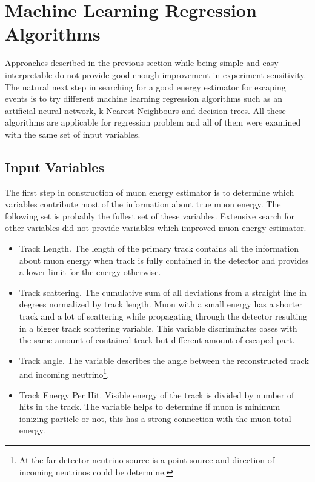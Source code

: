\section{Machine Learning Regression Algorithms}
Approaches described in the previous section while being simple and easy interpretable do
not provide good enough improvement in experiment sensitivity. The natural next step in
searching for a good energy estimator for escaping events is to try different machine 
learning regression algorithms such as an artificial neural network, k Nearest Neighbours and
decision trees. All these algorithms are applicable for regression problem and all of them 
were examined with the same set of input variables.

\subsection{Input Variables}
The first step in construction of muon energy estimator is to determine which variables 
contribute most of the information about true muon energy. The following set is probably
the fullest set of these variables. Extensive search for other variables did not provide 
variables which improved muon energy estimator.
\begin{itemize}
\item Track Length. The length of the primary track contains all the information about muon
energy when track is fully contained in the detector and provides a lower limit for the 
energy otherwise.
\item Track scattering. The cumulative sum of all deviations from a straight line in degrees
normalized by track length. Muon with a small energy has a shorter track and a lot of scattering 
while propagating through the detector resulting in a bigger track scattering variable. 
This variable discriminates cases with the same amount of contained track but different amount
of escaped part.
\item Track angle. The variable describes the angle between the reconstructed track and 
incoming neutrino\footnote{At the far detector neutrino source is a point source and direction
of incoming neutrinos could be determine.}. 
\item Track Energy Per Hit. Visible energy of the track is divided by number of hits in the 
track. The variable helps to determine if muon is minimum ionizing particle or not, this has
a strong connection with the muon total energy.
\end{itemize}

